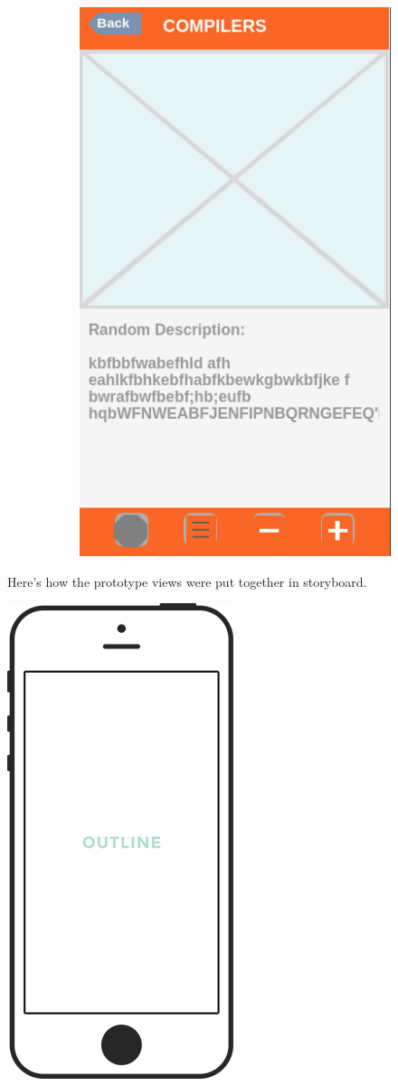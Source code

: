 \documentclass{article}
\begin{document}
\begin{figure}[ht]
\begin{subfigure}{}
			\includegraphics[scale=0.25]{fluidcard.png}
	\end{subfigure}
\end{figure}

Here's how the prototype views were put together in storyboard.
\begin{center}
	\vspace{1mm}
	\includegraphics[scale=0.2]{placeholder.png}
	\vspace{1mm}
\end{center}
\end{document}
